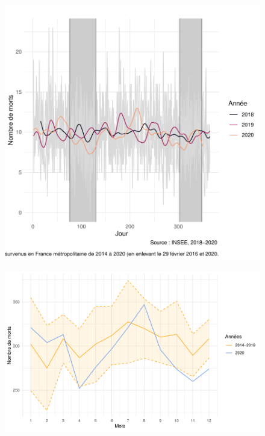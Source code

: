 \documentclass[titlepage]{article}
\begin{document}
\begin{figure}
\begin{center}
\includegraphics{Aussant_Forcadell_Sessego-courbe_2018_2019}
\end{center}
\end{figure}

\begin{figure}
\begin{center}
\includegraphics{Aussant_Forcadell_Sessego-courbe_2014_2020}
\end{center}
\end{figure}
\end{document}
